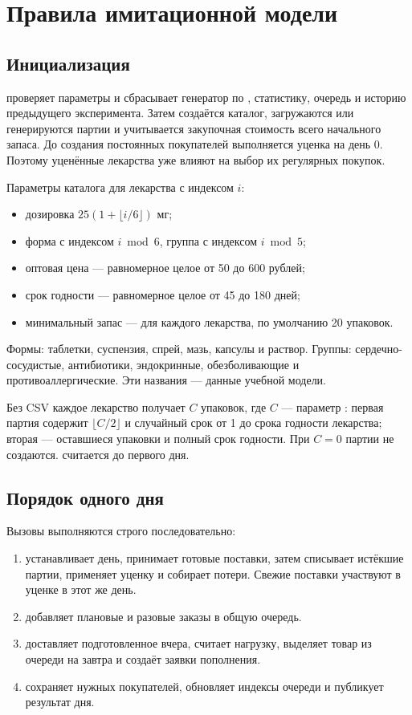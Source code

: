 \section{Правила имитационной модели}
\label{sec:model}

\subsection{Инициализация}
 проверяет параметры и сбрасывает генератор по
, статистику, очередь и историю предыдущего эксперимента.
Затем создаётся каталог, загружаются или генерируются партии и учитывается
закупочная стоимость всего начального запаса. До создания постоянных
покупателей выполняется уценка на день 0. Поэтому уценённые лекарства уже
влияют на выбор их регулярных покупок.

Параметры каталога для лекарства с индексом $i$:
\begin{itemize}
  \item дозировка $25(1+\lfloor i/6\rfloor)$ мг;
  \item форма с индексом $i\bmod 6$, группа с индексом $i\bmod 5$;
  \item оптовая цена --- равномерное целое от 50 до 600 рублей;
  \item срок годности --- равномерное целое от 45 до 180 дней;
  \item минимальный запас ---  для каждого лекарства,
        по умолчанию 20 упаковок.
\end{itemize}
Формы: таблетки, суспензия, спрей, мазь, капсулы и раствор. Группы:
сердечно-сосудистые, антибиотики, эндокринные, обезболивающие и
противоаллергические. Эти названия --- данные учебной модели.

Без CSV каждое лекарство получает $C$ упаковок, где $C$ --- параметр
:
первая партия содержит $\lfloor C/2\rfloor$ и случайный срок от 1 до срока
годности лекарства; вторая --- оставшиеся упаковки и полный срок годности.
При $C=0$ партии не создаются.  считается до первого дня.

\subsection{Порядок одного дня}
Вызовы выполняются строго последовательно:
\begin{enumerate}
  \item {} устанавливает день, принимает готовые
        поставки, затем списывает истёкшие партии, применяет уценку и собирает
        потери. Свежие поставки участвуют в уценке в этот же день.
  \item {} добавляет плановые и разовые заказы
        в общую очередь.
  \item {} доставляет подготовленное вчера,
        считает нагрузку, выделяет товар из очереди на завтра и создаёт
        заявки пополнения.
  \item {} сохраняет нужных покупателей,
        обновляет индексы очереди и публикует результат дня.
\end{enumerate}

